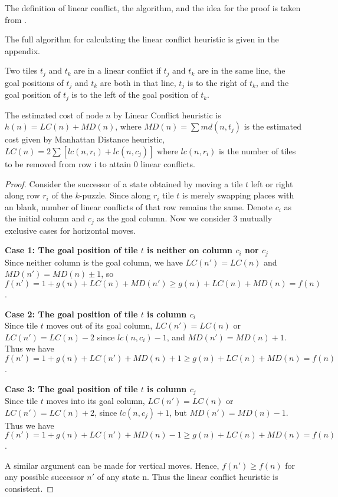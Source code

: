 \documentclass{llncs}
\begin{document}
\begin{itemize}
\item[] The definition of linear conflict, the algorithm, and the idea for the proof is taken from \cite{lc}.
\item[]The full algorithm for calculating the linear conflict heuristic is given in the appendix.

\begin{definition}
Two tiles $t_j$ and $t_k$ are in a linear conflict if $t_j$ and $t_k$ are in the same line, the goal positions of $t_j$ and $t_k$ are both in that line, $t_j$ is to the right of $t_k$, and the goal position of $t_j$ is to the left of the goal position of $t_k$.
\end{definition}

The estimated cost of node $n$ by Linear Conflict heuristic is $h(n) = LC(n) + MD(n)$, where $MD(n)=\sum md(n,t_j)$ is the estimated cost given by Manhattan Distance heuristic, $LC(n) = 2\sum[lc(n,r_i) +lc(n,c_j)]$ where $lc(n,r_i)$ is the number of tiles to be removed from row i to attain 0 linear conflicts.
\begin{proof}
Consider the successor of a state obtained by moving a tile $t$ left or right along row $r_i$ of the $k$-puzzle. Since along $r_i$ tile $t$ is merely swapping places with an blank, number of linear conflicts of that row remains the same.
Denote $c_i$ as the initial column and $c_j$ as the goal column. Now we consider 3 mutually exclusive cases for horizontal moves.
\item[]\textbf{Case 1: The goal position of tile $t$ is neither on column $c_i$ nor $c_j$} \\
Since neither column is the goal column, we have $LC(n') = LC(n)$ and $MD(n') = MD(n) \pm 1$, so $f(n') = 1 + g(n) + LC(n) + MD(n') \geq g(n) + LC(n) + MD(n) = f(n)$.
\item[]\textbf{Case 2: The goal position of tile $t$ is column $c_i$} \\
Since tile $t$ moves out of its goal column, $LC(n') = LC(n)$ or $LC(n') = LC(n) - 2$ since $lc(n,c_i) - 1$, and $MD(n') = MD(n) + 1$. Thus we have $f(n') = 1 + g(n) + LC(n') + MD(n) + 1 \geq g(n) + LC(n) + MD(n) = f(n)$.
\item[]\textbf{Case 3: The goal position of tile $t$ is column $c_j$} \\
Since tile $t$ moves into its goal column, $LC(n') = LC(n)$ or $LC(n') = LC(n) + 2$, since $lc(n,c_j) + 1$, but $MD(n') = MD(n) - 1$. Thus we have $f(n') = 1 + g(n) + LC(n') + MD(n) - 1 \geq g(n) + LC(n) + MD(n) = f(n)$.  \\

\item[]A similar argument can be made for vertical moves. Hence, $f(n') \geq f(n)$ for any possible successor $n'$ of any state n. Thus the linear conflict heuristic is consistent.
\end{proof}
\end{itemize}
\end{document}
